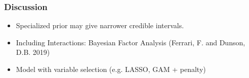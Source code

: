 \documentclass{beamer}
\begin{document}
\begin{frame}
\frametitle{Discussion}

\begin{itemize}

\item Specialized prior may give narrower credible intervals.
\pause
\item Including Interactions: Bayesian Factor Analysis (Ferrari, F. and Dunson, D.B. 2019)
\pause
\item Model with variable selection (e.g. LASSO, GAM + penalty)


\end{itemize}
\end{frame}
\end{document}
